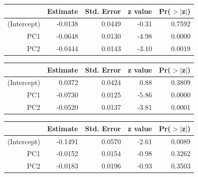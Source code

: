 \documentclass[a4paper,12pt]{Latex/Classes/PhDthesisPSnPDF}
\begin{document}
\newpage

\begin{center}
\begin{table}[ht]
\centering
\begin{tabular}{rrrrr}
  \hline
 & Estimate & Std. Error & z value & Pr($>$$|$z$|$) \\ 
  \hline
(Intercept) & -0.0138 & 0.0449 & -0.31 & 0.7592 \\ 
  PC1 & -0.0648 & 0.0130 & -4.98 & 0.0000 \\ 
  PC2 & -0.0444 & 0.0143 & -3.10 & 0.0019 \\ 
   \hline
\end{tabular}
\end{table}\end{center}

\begin{center}
\begin{table}[ht]
\centering
\begin{tabular}{rrrrr}
  \hline
 & Estimate & Std. Error & z value & Pr($>$$|$z$|$) \\ 
  \hline
(Intercept) & 0.0372 & 0.0424 & 0.88 & 0.3809 \\ 
  PC1 & -0.0730 & 0.0125 & -5.86 & 0.0000 \\ 
  PC2 & -0.0520 & 0.0137 & -3.81 & 0.0001 \\ 
   \hline
\end{tabular}
\end{table}\end{center}

\newpage

\begin{center}
\begin{table}[ht]
\centering
\begin{tabular}{rrrrr}
  \hline
 & Estimate & Std. Error & z value & Pr($>$$|$z$|$) \\ 
  \hline
(Intercept) & -0.1491 & 0.0570 & -2.61 & 0.0089 \\ 
  PC1 & -0.0152 & 0.0154 & -0.98 & 0.3262 \\ 
  PC2 & -0.0183 & 0.0196 & -0.93 & 0.3503 \\ 
   \hline
\end{tabular}
\end{table}\end{center}
\end{document}

